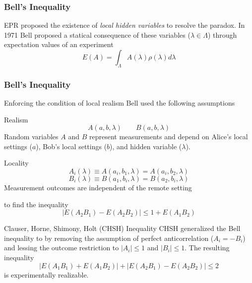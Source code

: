 \documentclass{beamer}
\begin{document}
\begin{frame}\frametitle{Bell's Inequality}
    EPR proposed the existence of \emph{local hidden variables} to resolve the paradox. In 1971 Bell proposed a 
    statical consequence of these variables ($\lambda\in\Lambda$) through expectation values of an experiment
    $$E(A) = \int_{\Lambda}A(\lambda)\rho(\lambda)d\lambda$$
\end{frame}

\begin{frame}\frametitle{Bell's Inequality}
    Enforcing the condition of local realism Bell used the following assumptions
    \begin{block}{Realism}
        $$A(a,b,\lambda)\qquad B(a,b,\lambda)$$
        Random variables $A$ and $B$ represent measurements and depend on Alice's local 
        settings ($a$), Bob's local settings ($b$), and hidden variable ($\lambda$).
    \end{block}
    \begin{block}{Locality}
            $$A_i(\lambda) \equiv A(a_i,b_1,\lambda) = A(a_i,b_2,\lambda)$$
            $$B_i(\lambda) \equiv B(a_1,b_i,\lambda) = B(a_2,b_i,\lambda)$$
        Measurement outcomes are independent of the remote setting
    \end{block}
    to find the inequality
    $$\left|E(A_2B_1) - E(A_2B_2)\right| \le 1 + E(A_1B_2)$$
\end{frame}

\begin{frame}{Clauser, Horne, Shimony, Holt (CHSH) Inequality}
    CHSH generalized the Bell inequality to by removing the assumption of perfect anticorrelation ($A_i = -B_i$) and
    lessing the outcome restriction to $|A_i|\le1$ and $|B_i|\le1$. The resulting inequality 
    $$\left|E(A_1B_1) + E(A_1B_2)\right| + \left|E(A_2B_1) - E(A_2B_2)\right| \le 2$$
    is experimentally realizable.
\end{frame}
\end{document}
